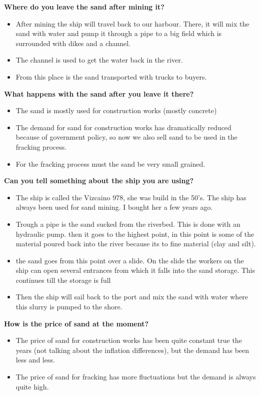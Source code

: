 \textbf{Where do you leave the sand after mining it?}
\begin{itemize}
    \item After mining the ship will travel back to our harbour. There, it will mix the sand with water and pump it through a pipe to a big field which is surrounded with dikes and a channel.
    \item The channel is used to get the water back in the river.
    \item From this place is the sand transported with trucks to buyers.
\end{itemize}

\textbf{What happens with the sand after you leave it there?}
\begin{itemize}
    \item The sand is mostly used for construction works (mostly concrete)
    \item The demand for sand for construction works has dramatically reduced because of government policy, so now we also sell sand to be used in the fracking process. 
    \item For the fracking process must the sand be very small grained. 
\end{itemize}

\textbf{Can you tell something about the ship you are using?}
\begin{itemize}
    \item The ship is called the Vizcaino 978, she was build in the 50's. The ship has always been used for sand mining. I bought her a few years ago. 
    \item Trough a pipe is the sand sucked from the riverbed. This is done with an hydraulic pump. then it goes to the highest point, in this point is some of the material poured back into the river because its to fine material (clay and silt). 
    \item the sand goes from this point over a slide. On the slide the workers on the ship can open several entrances from which it falls into the sand storage. This continues till the storage is full
    \item Then the ship will sail back to the port and mix the sand with water where this slurry is pumped to the shore. 
\end{itemize}

\textbf{How is the price of sand at the moment?}
\begin{itemize}
    \item The price of sand for construction works has been quite constant true the years (not talking about the inflation differences), but the demand has been less and less.
    \item The price of sand for fracking has more fluctuations but the demand is always quite high.
\end{itemize}

